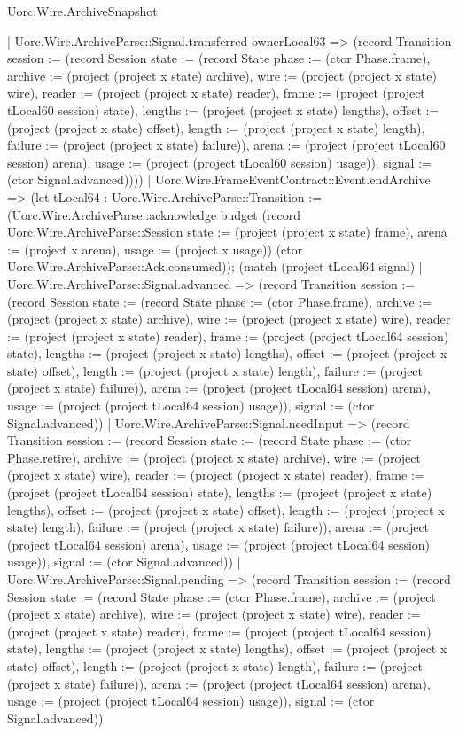 \begin{lexlean}{Uorc.Wire.ArchiveSnapshot}
\begin{semanticmodule}
{        | Uorc.Wire.ArchiveParse::Signal.transferred ownerLocal63 => (record Transition {session := (record Session {state := (record State {phase := (ctor Phase.frame), archive := (project (project x state) archive), wire := (project (project x state) wire), reader := (project (project x state) reader), frame := (project (project tLocal60 session) state), lengths := (project (project x state) lengths), offset := (project (project x state) offset), length := (project (project x state) length), failure := (project (project x state) failure)}), arena := (project (project tLocal60 session) arena), usage := (project (project tLocal60 session) usage)}), signal := (ctor Signal.advanced)})))
      | Uorc.Wire.FrameEventContract::Event.endArchive => (let tLocal64 : Uorc.Wire.ArchiveParse::Transition := (Uorc.Wire.ArchiveParse::acknowledge budget (record Uorc.Wire.ArchiveParse::Session {state := (project (project x state) frame), arena := (project x arena), usage := (project x usage)}) (ctor Uorc.Wire.ArchiveParse::Ack.consumed)); (match (project tLocal64 signal)
        | Uorc.Wire.ArchiveParse::Signal.advanced => (record Transition {session := (record Session {state := (record State {phase := (ctor Phase.frame), archive := (project (project x state) archive), wire := (project (project x state) wire), reader := (project (project x state) reader), frame := (project (project tLocal64 session) state), lengths := (project (project x state) lengths), offset := (project (project x state) offset), length := (project (project x state) length), failure := (project (project x state) failure)}), arena := (project (project tLocal64 session) arena), usage := (project (project tLocal64 session) usage)}), signal := (ctor Signal.advanced)})
        | Uorc.Wire.ArchiveParse::Signal.needInput => (record Transition {session := (record Session {state := (record State {phase := (ctor Phase.retire), archive := (project (project x state) archive), wire := (project (project x state) wire), reader := (project (project x state) reader), frame := (project (project tLocal64 session) state), lengths := (project (project x state) lengths), offset := (project (project x state) offset), length := (project (project x state) length), failure := (project (project x state) failure)}), arena := (project (project tLocal64 session) arena), usage := (project (project tLocal64 session) usage)}), signal := (ctor Signal.advanced)})
        | Uorc.Wire.ArchiveParse::Signal.pending => (record Transition {session := (record Session {state := (record State {phase := (ctor Phase.frame), archive := (project (project x state) archive), wire := (project (project x state) wire), reader := (project (project x state) reader), frame := (project (project tLocal64 session) state), lengths := (project (project x state) lengths), offset := (project (project x state) offset), length := (project (project x state) length), failure := (project (project x state) failure)}), arena := (project (project tLocal64 session) arena), usage := (project (project tLocal64 session) usage)}), signal := (ctor Signal.advanced)})
}
\end{semanticmodule}
\end{lexlean}
